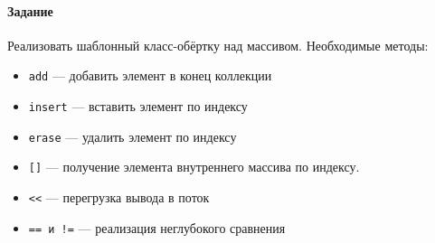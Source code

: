 \paragraph{Задание}
Реализовать шаблонный класс-обёртку над массивом.
Необходимые методы:
\begin{itemize}
    \item \texttt{add} --- добавить элемент в конец коллекции
    \item \texttt{insert} --- вставить элемент по индексу
    \item \texttt{erase} --- удалить элемент по индексу
    \item \texttt{[]} --- получение элемента внутреннего массива по индексу.
    \item \texttt{<{}<} --- перегрузка вывода в поток
    \item \texttt{== и !=} --- реализация неглубокого сравнения
\end{itemize}




